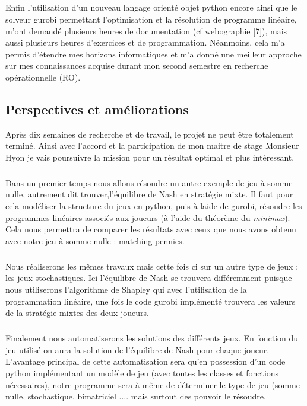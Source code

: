 \documentclass[a4paper, 12pt, twoside]{article}
\begin{document}
{{{{{\subparagraph*{}{Enfin l'utilisation d'un nouveau langage orienté objet \textsf{python} encore ainsi que le solveur \textsf{gurobi} permettant l'optimisation et la résolution de programme linéaire, m'ont demandé plusieurs heures de documentation (cf webographie [7]), mais aussi plusieurs heures d'exercices et de programmation. Néanmoins, cela m'a permis d'étendre mes horizons informatiques et m'a donné une meilleur approche sur mes connaissances acquise durant mon second semestre en recherche opérationnelle (RO).}

\subsection{Perspectives et améliorations}
Après dix semaines de recherche et de travail, le projet ne peut être totalement terminé.  Ainsi avec l'accord et la participation de mon maitre de stage Monsieur \textsf{Hyon} je vais   poursuivre la mission pour un résultat optimal et plus intéressant.

\subparagraph*{}{Dans un premier temps nous allons résoudre un autre exemple de \textsf{jeu à somme nulle}, autrement dit trouver,l'\textsf{équilibre de Nash} en stratégie mixte. Il faut pour cela modéliser la structure du jeux en \textsf{python}, puis à laide de \textsf{gurobi}, résoudre les programmes linéaires associés aux joueurs (à l'aide du théorème du \textsl{minimax}). Cela nous permettra de comparer les résultats avec ceux que nous avons obtenu avec notre jeu à somme nulle : \textsf{matching pennies}.}

\subparagraph*{}{Nous réaliserons les mêmes travaux mais cette fois ci sur un autre type de jeux : les jeux \textsf{stochastiques}. Ici l'\textsf{équilibre de Nash} se trouvera différemment puisque nous utiliserons \textsf{l'algorithme de Shapley} qui avec l'utilisation de la programmation linéaire, une fois le code \textsf{gurobi} implémenté trouvera les valeurs de la stratégie mixtes des deux joueurs.}

\subparagraph*{}{Finalement nous automatiserons les solutions des différents jeux. En fonction du jeu utilisé on aura la solution de l'\textsf{équilibre de Nash} pour chaque joueur. L'avantage principal de cette automatisation sera qu'en possession d'un code \textsf{python} implémentant un modèle de jeu (avec toutes les classes et fonctions nécessaires), notre programme sera à même de déterminer le type de jeu (\textsf{somme nulle, stochastique, bimatriciel ....} mais surtout des pouvoir le résoudre. }

}}}}}
\end{document}
